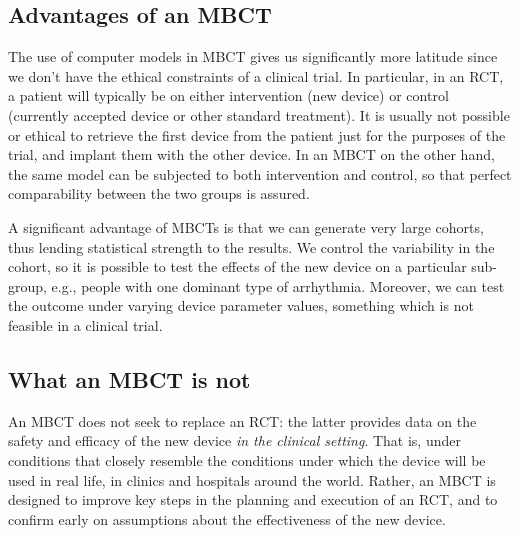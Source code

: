 \subsection{Advantages of an \ac{MBCT}}
The use of computer models in MBCT gives us significantly more latitude since we don't have the ethical constraints of a clinical trial.
In particular, in an \ac{RCT}, a patient will typically be on either intervention (new device) or control (currently accepted device or other standard treatment). 
It is usually not possible or ethical to retrieve the first device from the patient just for the purposes of the trial, and implant them with the other device.
In an \ac{MBCT} on the other hand, the same model can be subjected to both intervention and control, so that perfect comparability between the two groups is assured.

A significant advantage of \acp{MBCT} is that we can generate very large cohorts, thus lending statistical strength to the results.
We control the variability in the cohort, so it is possible to test the effects of the new device on a particular sub-group, e.g., people with one dominant type of arrhythmia.
Moreover, we can test the outcome under varying device parameter values, something which is not feasible in a clinical trial.

\subsection{What an \ac{MBCT} is not}
An \ac{MBCT} does not seek to replace an \ac{RCT}: the latter provides data on the safety and efficacy of the new device \emph{in the clinical setting}.
That is, under conditions that closely resemble the conditions under which the device will be used in real life, in clinics and hospitals around the world.
Rather, an \ac{MBCT} is designed to improve key steps in the planning and execution of an \ac{RCT}, and to confirm early on assumptions about the effectiveness of the new device.

